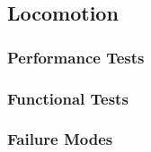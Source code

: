 
\subsection{Locomotion}
\label{sec:verification_locomotion}


\subsubsection{Performance Tests}
\label{sec:locomotion_pt}

\subsubsection{Functional Tests}
\label{sec:locomotion_ft}

\subsubsection{Failure Modes}
\label{sec:locomotion_fm}